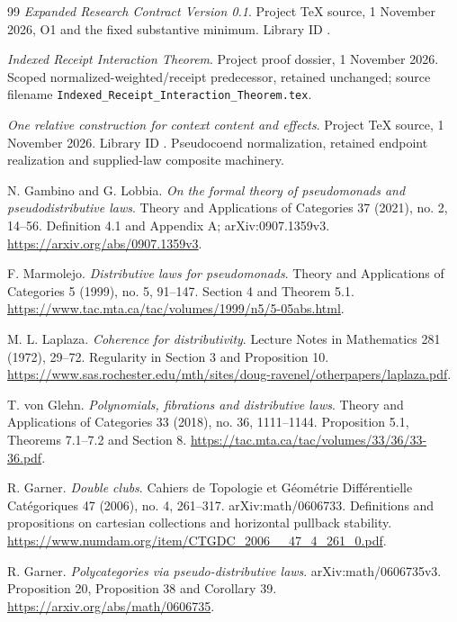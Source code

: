 \documentclass[11pt,a4paper]{article}
\theoremstyle{definition}
\begin{document}
\begin{thebibliography}{99}
\emph{Expanded Research Contract Version 0.1}. Project TeX source,
1 November 2026, O1 and the fixed substantive minimum. Library ID
\texttt{}.

\emph{Indexed Receipt Interaction Theorem}. Project proof dossier,
1 November 2026. Scoped normalized-weighted/receipt predecessor, retained
unchanged; source filename \texttt{Indexed\_Receipt\_Interaction\_Theorem.tex}.

\emph{One relative construction for context content and effects}. Project
TeX source, 1 November 2026. Library ID
\texttt{}.
Pseudocoend normalization, retained endpoint realization and supplied-law
composite machinery.

N. Gambino and G. Lobbia. \emph{On the formal theory of pseudomonads and
pseudodistributive laws}. Theory and Applications of Categories 37 (2021),
no. 2, 14--56. Definition 4.1 and Appendix A; arXiv:0907.1359v3.
\url{https://arxiv.org/abs/0907.1359v3}.

F. Marmolejo. \emph{Distributive laws for pseudomonads}. Theory and
Applications of Categories 5 (1999), no. 5, 91--147. Section 4 and Theorem 5.1.
\url{https://www.tac.mta.ca/tac/volumes/1999/n5/5-05abs.html}.

M. L. Laplaza. \emph{Coherence for distributivity}. Lecture Notes in
Mathematics 281 (1972), 29--72. Regularity in Section 3 and Proposition 10.
\url{https://www.sas.rochester.edu/mth/sites/doug-ravenel/otherpapers/laplaza.pdf}.

T. von Glehn. \emph{Polynomials, fibrations and distributive laws}. Theory
and Applications of Categories 33 (2018), no. 36, 1111--1144.
Proposition 5.1, Theorems 7.1--7.2 and Section 8.
\url{https://tac.mta.ca/tac/volumes/33/36/33-36.pdf}.

R. Garner. \emph{Double clubs}. Cahiers de Topologie et G\'eom\'etrie
Diff\'erentielle Cat\'egoriques 47 (2006), no. 4, 261--317.
arXiv:math/0606733. Definitions and propositions on cartesian collections and
horizontal pullback stability.
\url{https://www.numdam.org/item/CTGDC_2006__47_4_261_0.pdf}.

R. Garner. \emph{Polycategories via pseudo-distributive laws}.
arXiv:math/0606735v3. Proposition 20, Proposition 38 and Corollary 39.
\url{https://arxiv.org/abs/math/0606735}.


\end{thebibliography}
\end{document}
